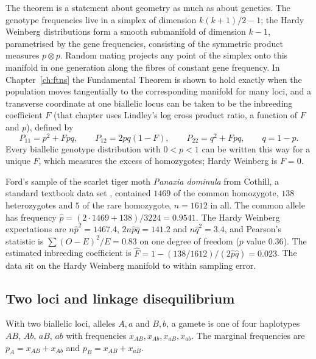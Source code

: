 The theorem is a statement about geometry as much as about genetics. The genotype frequencies
live in a simplex of dimension $k(k+1)/2-1$; the Hardy Weinberg distributions form a smooth
submanifold of dimension $k-1$, parametrised by the gene frequencies, consisting of the
symmetric product measures $p\otimes p$. Random mating projects any point of the simplex onto
this manifold in one generation along the fibres of constant gene frequency. In
Chapter~\ref{ch:ftns} the Fundamental Theorem is shown to hold exactly when the population moves
tangentially to the corresponding manifold for many loci, and a transverse coordinate at one
biallelic locus can be taken to be the inbreeding coefficient $F$ (that chapter uses Lindley's log cross product ratio, a function of $F$ and $p$), defined by
\begin{equation}\label{toolkit:eq:F}
P_{11}=p^2+Fpq,\qquad P_{12}=2pq(1-F),\qquad P_{22}=q^2+Fpq,\qquad q=1-p.
\end{equation}
Every biallelic genotype distribution with $0<p<1$ can be written this way for a unique $F$,
which measures the excess of homozygotes; Hardy Weinberg is $F=0$.

\begin{example}\label{toolkit:ex:moth}
Ford's sample of the scarlet tiger moth \emph{Panaxia dominula} from Cothill, a standard textbook
data set \citep{toolkit:ford1971}, contained $1469$ of the common homozygote, $138$
heterozygotes and $5$ of the rare homozygote, $n=1612$ in all. The common allele has frequency
$\hat p=(2\cdot1469+138)/3224=0.9541$. The Hardy Weinberg expectations are $n\hat p^2=1467.4$,
$2n\hat p\hat q=141.2$ and $n\hat q^2=3.4$, and Pearson's statistic is
$\sum(O-E)^2/E=0.83$ on one degree of freedom ($p$ value $0.36$). The estimated inbreeding
coefficient is $\hat F=1-(138/1612)/(2\hat p\hat q)=0.023$. The data sit on the Hardy Weinberg
manifold to within sampling error.
\end{example}

\subsection{Two loci and linkage disequilibrium}\label{toolkit:sec:ld}

With two biallelic loci, alleles $A,a$ and $B,b$, a gamete is one of four haplotypes $AB$,
$Ab$, $aB$, $ab$ with frequencies $x_{AB},x_{Ab},x_{aB},x_{ab}$. The marginal frequencies are
$p_A=x_{AB}+x_{Ab}$ and $p_B=x_{AB}+x_{aB}$.

